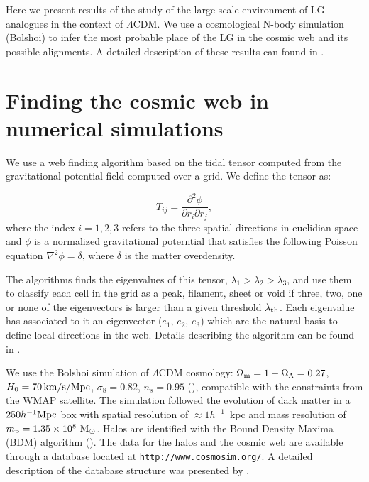\documentclass{iau}
\newcommand{\hmpc}{{\ifmmode{h^{-1}{\rm Mpc}}\else{$h^{-1}$Mpc }\fi}}
\begin{document}
Here we present results of the study of the large scale environment of
LG analogues in the context of $\Lambda$CDM. We use a cosmological
N-body simulation (Bolshoi) to infer the most probable place of the LG
in the cosmic web and its possible alignments. A detailed description
of these results can found in \cite{lgweb}.



\section{Finding the cosmic web in numerical simulations}

We use a web finding algorithm based on the tidal tensor computed from
the gravitational potential field computed over a grid. We define the
tensor as:

\begin{equation}
T_{ij} = \frac{\partial^2\phi}{\partial r_{i}\partial r_{j}}, 
\end{equation}
%
where the index $i=1,2,3$ refers to the three spatial directions in
euclidian space and $\phi$ is a normalized gravitational poterntial
that satisfies the following Poisson equation $\nabla^2 \phi=\delta$,
where $\delta$ is the matter overdensity.

The algorithms finds the eigenvalues of this tensor, 
$\lambda_1>\lambda_2>\lambda_3$, and use them to classify each cell in
the grid as a peak, filament, sheet or void if three, two, one or none
of the eigenvectors is larger than a given threshold $\lambda_{\rm
  th}$. Each eigenvalue has associated to it an eigenvector ($e_{1}$,
$e_{2}$, $e_{3}$) which are the natural basis to define local
directions in the web. Details describing the algorithm can be found
in \cite[Forero-Romero et al. (2009)]{Tweb}.


We use the Bolshoi simulation of $\Lambda$CDM cosmology: $\Omega_{\rm
  m}=1-\Omega_{\Lambda}=0.27$, $H_0=70\,\rm km/s/Mpc$,
$\sigma_8=0.82$, $n_s=0.95$ (\cite{2011ApJ...740..102K}), compatible
with the constraints from the WMAP satellite. The simulation followed the evolution of dark
matter in a $250 \hmpc$ box with spatial resolution of $\approx
1h^{-1}$~kpc and mass resolution of $m_{\rm p}=1.35\times 10^8\ \rm
M_{\odot}$. Halos are identified with the Bound Density Maxima (BDM) algorithm
(\cite{1997astro.ph.12217K}). The data for the halos and the cosmic
web are available through a database located at
{\tt http://www.cosmosim.org/}. A detailed description of the database
structure was presented by \cite{Riebe2013}. 
\end{document}
